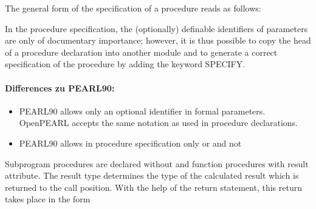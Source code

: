 \begin{grammarframe}














\end{grammarframe}

The general form of the specification of a procedure reads as follows:

\begin{grammarframe}



\end{grammarframe}

In the procedure specification, the (optionally) definable identifiers of
parameters are only of documentary importance; however, it is thus
possible to copy the head of a procedure declaration into another module
and to generate a correct specification of the procedure by adding the
keyword SPECIFY.

\paragraph{Differences zu PEARL90:}
\begin{itemize}
\item PEARL90 allows only an optional identifier in formal parameters. OpenPEARL accepts the same notation as used in procedure declarations.
\item PEARL90 allows in procedure specification only  or  and not 
\end{itemize}


Subprogram procedures are declared without and function procedures with
result attribute. The result type determines the type of the calculated
result which is returned to the call position. With the help of the
return statement, this return takes place in the form

